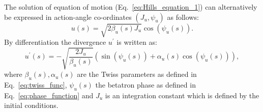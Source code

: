 The solution of equation of motion (Eq.~\eqref{eq:Hills_equation_1}) can alternatively be expressed in action-angle co-ordinates $(J_u, \psi_u)$ as follows:
\begin{equation}\label{eq:position_action_anlge}
    u(s) = \sqrt{2 \beta_u(s) J_u} \cos{(\psi_u(s))}.
\end{equation} 
By differentiation the divergence $u^\prime$ is written as:
\begin{equation}\label{eq:divergence_action_anlge}
    u^\prime(s) = - \sqrt{\frac{2 J_u}{\beta_u(s)}} (\sin{(\psi_u(s))}+\alpha_u(s)\cos{(\psi_u(s))}),
\end{equation} 
where $\beta_u(s), \alpha_u(s)$ are the Twiss parameters as defined in Eq.~\eqref{eq:twiss_func}, $\psi_u(s)$ the betatron phase as defined in Eq.~\eqref{eq:phase_function} and $J_u$ is an integration constant which is defined by the initial conditions. %




